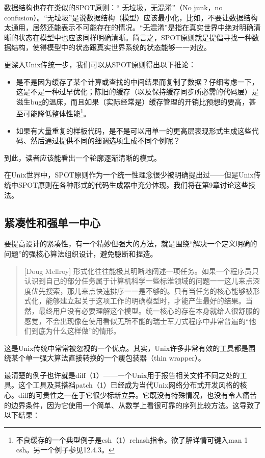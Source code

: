\documentclass[12pt,oneside]{book}
\begin{document}
\begin{common-format}
数据结构也存在类似的SPOT原则：“ 无垃圾，无混淆”（No junk，no confusion）。“无垃圾”是说数据结构（模型）应该最小化，比如，不要让数据结构太通用，居然还能表示不可能存在的情况。“无混淆”是指在真实世界中绝对明确清晰的状态在模型中也应该同样明确清晰。简言之，SPOT原则就是提倡寻找一种数据结构，使得模型中的状态跟真实世界系统的状态能够一一对应。

更深入Unix传统一步，我们可以从SPOT原则得出以下推论：

\begin{itemize}
\item 是不是因为缓存了某个计算或查找的中间结果而复制了数据？仔细考虑一下，这是不是一种过早优化；陈旧的缓存（以及保持缓存同步所必需的代码层）是滋生bug的温床，而且如果（实际经常是）缓存管理的开销比预想的要高，甚至可能降低整体性能\footnote{不良缓存的一个典型例子是csh（1）rehash指令。欲了解详情可键入man 1 csh。另一个例子参见12.4.3。}。
\item 如果有大量重复的样板代码，是不是可以用单一的更高层表现形式生成这些代码、然后通过提供不同的细调选项生成不同个例呢？
\end{itemize}

到此，读者应该能看出一个轮廓逐渐清晰的模式。

在Unix世界中，SPOT原则作为一个统一性理念很少被明确提出过——但是Unix传统中SPOT原则在各种形式的代码生成器中充分体现。我们将在第9章讨论这些技法。

\subsection{紧凑性和强单一中心}
要提高设计的紧凑性，有一个精妙但强大的方法，就是围绕“解决一个定义明确的问题”的强核心算法组织设计，避免臆断和捏造。

\begin{quote}[Doug Mcllroy]
形式化往往能极其明晰地阐述一项任务。如果一个程序员只认识到自己的部分任务属于计算机科学一些标淮领域的问题一一这儿来点深度优先搜索，那儿来点快速排序一一是不够的。只有当任务的核心能够被形式化，能够建立起关于这项工作的明确模型时，才能产生最好的结果。当然，最终用户没有必要理解这个模型。统一核心的存在本身就给人很舒服的感觉，不会出现像在使用看似无所不能的瑞士军刀式程序中非常普遍的“他们到底为什么这样做”的情形。
\end{quote}

这是Unix传统中常常被忽视的一个优点。其实，Unix许多非常有效的工具都是围绕某个单一强大算法直接转换的一个瘦包装器（thin wrapper）。

最清楚的例子也许就是diff（1）——一个Unix用于报告相关文件不同之处的工具。这个工具及其搭裆patch（1）已经成为当代Unix网络分布式开发风格的核心。diff的可贵性之一在于它很少标新立异。它既没有特殊情况，也没有令人痛苦的边界条件，因为它使用一个简单、从数学上看很可靠的序列比较方法。这导致了以下结果：


\end{common-format}
\end{document}
